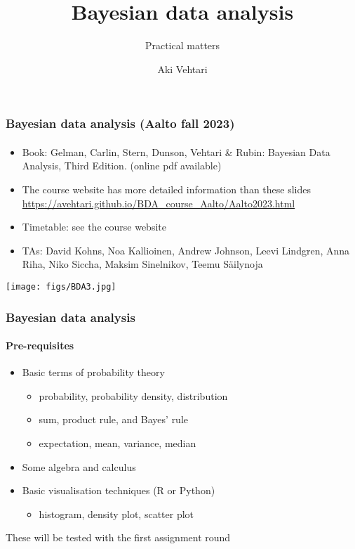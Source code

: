 \documentclass[english,t]{beamer}
\title[]{Bayesian data analysis}
\subtitle{Practical matters}
\author{Aki Vehtari}
\institute[Aalto University]{}
\begin{document}

\begin{frame}
  \frametitle{Bayesian data analysis (Aalto fall 2023)}  %
  \framesubtitle{}
  \begin{itemize}
  \item Book: Gelman, Carlin, Stern, Dunson, Vehtari \& Rubin: Bayesian Data
    Analysis, Third Edition. {\footnotesize (online pdf available)}
  \item The course website has more detailed information than these slides\\
    {\small\url{https://avehtari.github.io/BDA_course_Aalto/Aalto2023.html}}
  \item Timetable: see the course website
  \item TAs: David Kohns, Noa Kallioinen, Andrew Johnson, Leevi
    Lindgren, Anna Riha, Niko Siccha, Maksim Sinelnikov, Teemu
    Säilynoja
    \end{itemize}
    \vspace{-0.5\baselineskip}
 \begin{center}
   \texttt{[image: figs/BDA3.jpg]}
 \end{center}

\end{frame}

\begin{frame}
  \frametitle{Bayesian data analysis}  %
  \framesubtitle{Pre-requisites}
  \begin{itemize}
  \item Basic terms of probability theory
    \begin{itemize}
    \item probability, probability density, distribution
    \item sum, product rule, and Bayes' rule
    \item expectation, mean, variance, median
    \end{itemize}
  \item Some algebra and calculus
  \item Basic visualisation techniques (R or Python)
    \begin{itemize}
    \item histogram, density plot, scatter plot
    \end{itemize}
  \end{itemize}

  These will be tested with the first assignment round

\end{frame}
\end{document}
